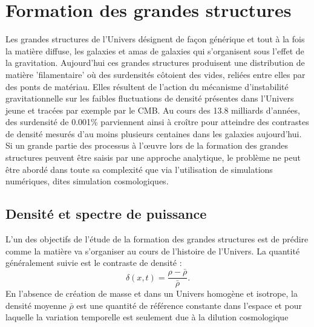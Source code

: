 
\chapter{Formation des grandes structures}
\label{s:struct}
Les grandes structures de l'Univers désignent de façon générique et tout à la fois la matière diffuse, les galaxies et amas de galaxies qui s'organisent sous l'effet de la gravitation. Aujourd'hui ces grandes structures produisent une distribution de matière 'filamentaire' où des surdensités côtoient des vides, reliées entre elles par des ponts de matériau. Elles résultent de l'action du mécanisme d'instabilité gravitationnelle sur les faibles fluctuations de densité présentes dans l'Univers jeune et tracées par exemple par le CMB. Au cours des 13.8 milliards d'années, des surdensité de 0.001\% parviennent ainsi à croître pour atteindre des contrastes de densité mesurés d'au moins plusieurs centaines dans les galaxies aujourd'hui. Si un grande partie des processus à l'œuvre lors de la formation des grandes structures peuvent être saisis par une approche analytique, le problème ne peut être abordé dans toute sa complexité que via l'utilisation de simulations numériques, dites simulation cosmologiques.

\section{Densité et spectre de puissance}
L'un des objectifs de l'étude de la formation des grandes structures est de prédire comme la matière va s'organiser au cours de l'histoire de l'Univers. La quantité généralement suivie est le contraste de densité :
\begin{equation}
\delta(x,t) =\frac{\rho-\bar\rho}{\bar\rho}.
\end{equation}
En l'absence de création de masse et dans un Univers homogène et isotrope, la densité moyenne $\bar{\rho}$ est une quantité de référence constante dans l'espace et pour laquelle la variation temporelle est seulement due à la dilution cosmologique 

